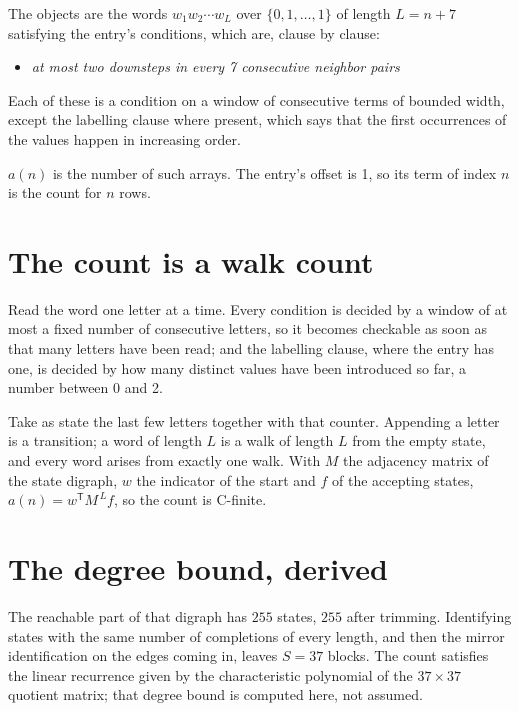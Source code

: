 \documentclass[11pt]{article}
\theoremstyle{definition}
\begin{document}
The objects are the words $w_1 w_2 \cdots w_L$ over $\{0,1,\dots,1\}$ of length $L = n + 7$ satisfying the entry's conditions, which are, clause by clause:

\begin{itemize}

\item {\itshape at most two downsteps in every 7 consecutive neighbor pairs}

\end{itemize}

Each of these is a condition on a window of consecutive terms of bounded width, except the labelling clause where present, which says that the first occurrences of the values happen in increasing order.

$a(n)$ is the number of such arrays. The entry's offset is 1, so its term of index $n$ is the count for $n$ rows.

\section{The count is a walk count}

Read the word one letter at a time. Every condition is decided by a window of at most a fixed number of consecutive letters, so it becomes checkable as soon as that many letters have been read; and the labelling clause, where the entry has one, is decided by how many distinct values have been introduced so far, a number between $0$ and 2.

Take as state the last few letters together with that counter. Appending a letter is a transition; a word of length $L$ is a walk of length $L$ from the empty state, and every word arises from exactly one walk. With $M$ the adjacency matrix of the state digraph, $w$ the indicator of the start and $f$ of the accepting states, $a(n) = w^{\mathsf T}M^{\,L}f$, so the count is C-finite.

\section{The degree bound, derived}

The reachable part of that digraph has $255$ states, $255$ after trimming. Identifying states with the same number of completions of every length, and then the mirror identification on the edges coming in, leaves $S = 37$ blocks. The count satisfies the linear recurrence given by the characteristic polynomial of the $37\times37$ quotient matrix; that degree bound is computed here, not assumed.
\end{document}
